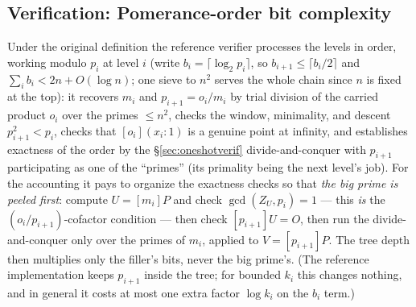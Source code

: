 \documentclass[11pt]{amsart}
\theoremstyle{plain}
\theoremstyle{definition}
\theoremstyle{remark}
\begin{document}
\subsection{Verification: Pomerance-order bit complexity}\label{sec:shortverif}

Under the original definition the reference verifier processes the levels in order, working modulo $p_i$ at
level $i$ (write $b_i = \lceil\log_2 p_i\rceil$, so $b_{i+1} \le \lceil b_i/2\rceil$ and
$\sum_i b_i < 2n + O(\log n)$; one sieve to $n^2$ serves the whole chain since $n$ is fixed at the top):
it recovers $m_i$ and $p_{i+1} = o_i/m_i$ by trial division of the carried product $o_i$ over the primes
${}\le n^2$, checks the window, minimality, and descent $p_{i+1}^2 < p_i$, checks that
$[o_i](x_i{:}1)$ is a genuine point at infinity, and establishes exactness of the order by the
\S\ref{sec:oneshotverif} divide-and-conquer with $p_{i+1}$ participating as one of the ``primes'' (its
primality being the next level's job).  For the accounting it pays to organize the exactness checks so
that \emph{the big prime is peeled first}: compute $U = [m_i]P$ and check $\gcd(Z_U, p_i) = 1$ --- this
\emph{is} the $(o_i/p_{i+1})$-cofactor condition --- then check $[p_{i+1}]U = O$, then run the
divide-and-conquer only over the primes of $m_i$, applied to $V = [p_{i+1}]P$.  The tree depth then
multiplies only the filler's bits, never the big prime's.  (The reference implementation keeps
$p_{i+1}$ inside the tree; for bounded $k_i$ this changes nothing, and in general it costs at most one
extra factor $\log k_i$ on the $b_i$ term.)
\end{document}

